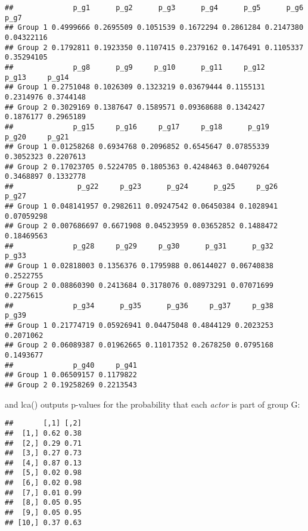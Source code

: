 \documentclass[
]{article}
\newenvironment{Shaded}{\begin{snugshade}}{\end{snugshade}}
\newcommand{\DataTypeTok}[1]{\textcolor[rgb]{0.13,0.29,0.53}{#1}}
\newcommand{\DecValTok}[1]{\textcolor[rgb]{0.00,0.00,0.81}{#1}}
\newcommand{\KeywordTok}[1]{\textcolor[rgb]{0.13,0.29,0.53}{\textbf{#1}}}
\newcommand{\NormalTok}[1]{#1}
\newcommand{\OperatorTok}[1]{\textcolor[rgb]{0.81,0.36,0.00}{\textbf{#1}}}
\newcommand{\StringTok}[1]{\textcolor[rgb]{0.31,0.60,0.02}{#1}}
\begin{document}
\begin{verbatim}
##              p_g1      p_g2      p_g3      p_g4      p_g5      p_g6       p_g7
## Group 1 0.4999666 0.2695509 0.1051539 0.1672294 0.2861284 0.2147380 0.04322116
## Group 2 0.1792811 0.1923350 0.1107415 0.2379162 0.1476491 0.1105337 0.35294105
##              p_g8      p_g9     p_g10      p_g11     p_g12     p_g13     p_g14
## Group 1 0.2751048 0.1026309 0.1323219 0.03679444 0.1155131 0.2314976 0.3744148
## Group 2 0.3029169 0.1387647 0.1589571 0.09368688 0.1342427 0.1876177 0.2965189
##              p_g15     p_g16     p_g17     p_g18      p_g19     p_g20     p_g21
## Group 1 0.01258268 0.6934768 0.2096852 0.6545647 0.07855339 0.3052323 0.2207613
## Group 2 0.17023705 0.5224705 0.1805363 0.4248463 0.04079264 0.3468897 0.1332778
##               p_g22     p_g23      p_g24      p_g25     p_g26      p_g27
## Group 1 0.048141957 0.2982611 0.09247542 0.06450384 0.1028941 0.07059298
## Group 2 0.007686697 0.6671908 0.04523959 0.03652852 0.1488472 0.18469563
##              p_g28     p_g29     p_g30      p_g31      p_g32     p_g33
## Group 1 0.02818003 0.1356376 0.1795988 0.06144027 0.06740838 0.2522755
## Group 2 0.08860390 0.2413684 0.3178076 0.08973291 0.07071699 0.2275615
##              p_g34      p_g35      p_g36     p_g37     p_g38     p_g39
## Group 1 0.21774719 0.05926941 0.04475048 0.4844129 0.2023253 0.2071062
## Group 2 0.06089387 0.01962665 0.11017352 0.2678250 0.0795168 0.1493677
##              p_g40     p_g41
## Group 1 0.06509157 0.1179822
## Group 2 0.19258269 0.2213543
\end{verbatim}

and lca() outputs p-values for the probability that each \emph{actor} is
part of group G:

\begin{Shaded}
\end{Shaded}

\begin{verbatim}
##       [,1] [,2]
##  [1,] 0.62 0.38
##  [2,] 0.29 0.71
##  [3,] 0.27 0.73
##  [4,] 0.87 0.13
##  [5,] 0.02 0.98
##  [6,] 0.02 0.98
##  [7,] 0.01 0.99
##  [8,] 0.05 0.95
##  [9,] 0.05 0.95
## [10,] 0.37 0.63
\end{verbatim}

\begin{Shaded}
\end{Shaded}
\end{document}
